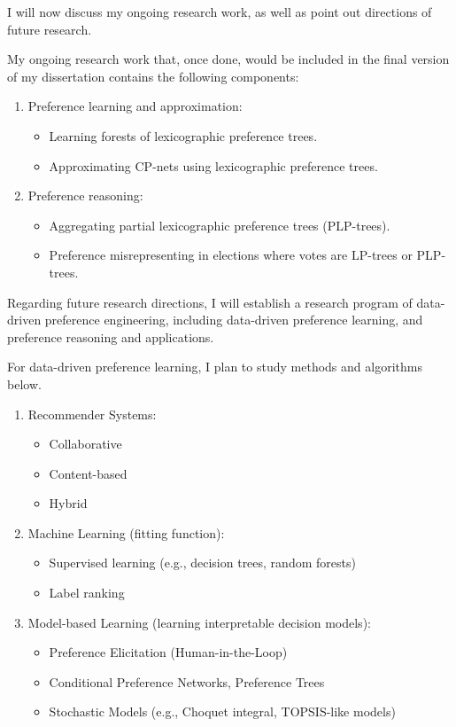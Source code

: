 I will now discuss my ongoing research work, as well as point out directions of
future research.

My ongoing research work that, once done, would be included in 
the final version of my dissertation contains the following components:

\begin{enumerate}  \itemsep -4pt
	\item Preference learning and approximation:
		\begin{itemize} \itemsep -5pt
			\item Learning forests of lexicographic preference trees.
			\item Approximating CP-nets using lexicographic preference trees.
		\end{itemize}
	\item Preference reasoning:
		\begin{itemize} \itemsep -5pt
			\item Aggregating partial lexicographic preference trees (PLP-trees).
			\item Preference misrepresenting in elections where votes are LP-trees or PLP-trees.
		\end{itemize}
\end{enumerate}

Regarding future research directions, I will establish a research program of data-driven
preference engineering, including data-driven preference learning, and preference
reasoning and applications.

For data-driven preference learning, I plan to study methods and algorithms below.
\begin{enumerate}
	\item Recommender Systems\cite{adomavicius2005toward}:
		\begin{itemize}
			\item Collaborative
			\item Content-based
			\item Hybrid
		\end{itemize}
	\item Machine Learning (fitting function):
		\begin{itemize}
			\item Supervised learning (e.g., decision trees, random forests)
			\item Label ranking\cite{hullermeier2008label}
		\end{itemize}
	\item Model-based Learning (learning interpretable decision models):
		\begin{itemize}
			\item Preference Elicitation (Human-in-the-Loop)
			\item Conditional Preference Networks, Preference Trees
			\item Stochastic Models (e.g., Choquet integral\cite{tehrani2011choquistic}, 
						TOPSIS-like models\cite{agarwal2014preference})
		\end{itemize}
\end{enumerate}

